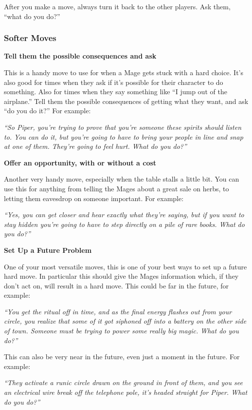 \documentclass[
]{article}
\begin{document}
After you make a move, always turn it back to the other players. Ask
them, ``what do you do?''

\hypertarget{softer-moves}{%
\subsubsection{Softer Moves}\label{softer-moves}}

\textbf{Tell them the possible consequences and ask}

This is a handy move to use for when a Mage gets stuck with a hard
choice. It's also good for times when they ask if it's possible for
their character to do something. Also for times when they say something
like ``I jump out of the airplane.'' Tell them the possible consequences
of getting what they want, and ask ``do you do it?'' For example:

\emph{``So Piper, you're trying to prove that you're someone these
spirits should listen to. You can do it, but you're going to have to
bring your people in line and snap at one of them. They're going to feel
hurt. What do you do?''}

\textbf{Offer an opportunity, with or without a cost}

Another very handy move, especially when the table stalls a little bit.
You can use this for anything from telling the Mages about a great sale
on herbs, to letting them eavesdrop on someone important. For example:

\emph{``Yes, you can get closer and hear exactly what they're saying,
but if you want to stay hidden you're going to have to step directly on
a pile of rare books. What do you do?''}

\textbf{Set Up a Future Problem}

One of your most versatile moves, this is one of your best ways to set
up a future hard move. In particular this should give the Mages
information which, if they don't act on, will result in a hard move.
This could be far in the future, for example:

\emph{``You get the ritual off in time, and as the final energy flashes
out from your circle, you realize that some of it got siphoned off into
a battery on the other side of town. Someone must be trying to power
some really big magic. What do you do?''}

This can also be very near in the future, even just a moment in the
future. For example:

\emph{``They activate a runic circle drawn on the ground in front of
them, and you see an electrical wire break off the telephone pole, it's
headed straight for Piper. What do you do?''}
\end{document}
